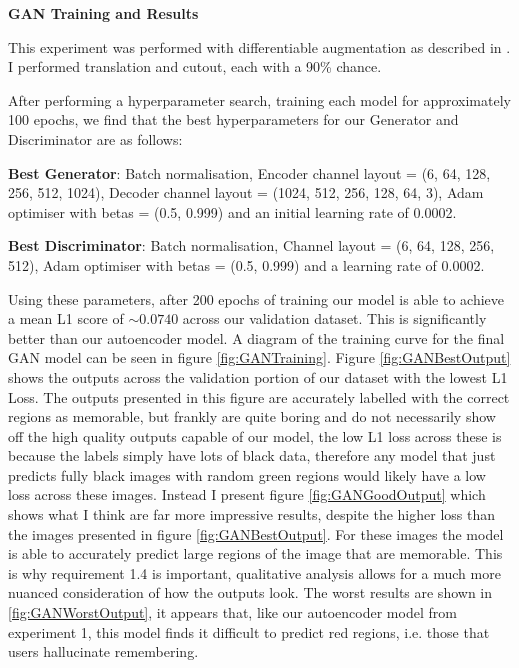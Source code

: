 \documentclass{UoYCSproject}
\begin{document}
\textbf{GAN Training and Results}

This experiment was performed with differentiable augmentation as described in \cite{zhao2020differentiable}. I performed translation and cutout, each with a 90\% chance.

After performing a hyperparameter search, training each model for approximately 100 epochs, we find that the best hyperparameters for our Generator and Discriminator are as follows:

\textbf{Best Generator}: Batch normalisation, Encoder channel layout = (6, 64, 128, 256, 512, 1024), Decoder channel layout = (1024, 512, 256, 128, 64, 3), Adam optimiser with betas = (0.5, 0.999) and an initial learning rate of 0.0002.

\textbf{Best Discriminator}: Batch normalisation, Channel layout = (6, 64, 128, 256, 512), Adam optimiser with betas = (0.5, 0.999) and a learning rate of 0.0002.

Using these parameters, after 200 epochs of training our model is able to achieve a mean L1 score of \( \sim 0.0740 \) across our validation dataset. This is significantly better than our autoencoder model. A diagram of the training curve for the final GAN model can be seen in figure \ref{fig:GANTraining}. 
Figure \ref{fig:GANBestOutput} shows the outputs across the validation portion of our dataset with the lowest L1 Loss. The outputs presented in this figure are accurately labelled with the correct regions as memorable, but frankly are quite boring and do not necessarily show off the high quality outputs capable of our model, the low L1 loss across these is because the labels simply have lots of black data, therefore any model that just predicts fully black images with random green regions would likely have a low loss across these images. 
Instead I present figure \ref{fig:GANGoodOutput} which shows what I think are far more impressive results, despite the higher loss than the images presented in figure \ref{fig:GANBestOutput}. For these images the model is able to accurately predict large regions of the image that are memorable. This is why requirement 1.4 is important, qualitative analysis allows for a much more nuanced consideration of how the outputs look.  
The worst results are shown in \ref{fig:GANWorstOutput}, it appears that, like our autoencoder model from experiment 1, this model finds it difficult to predict red regions, i.e. those that users hallucinate remembering.
\end{document}
